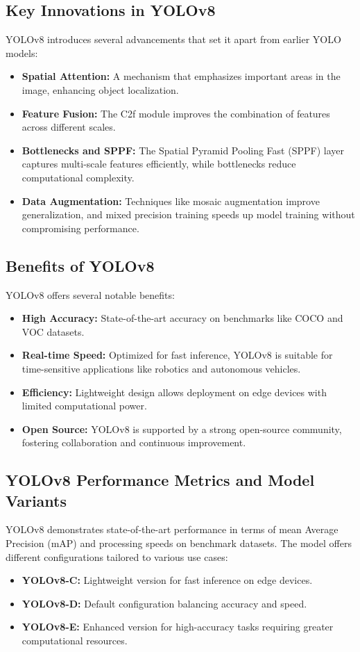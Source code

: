 \documentclass[conference]{IEEEtran}
\begin{document}
\subsection{Key Innovations in YOLOv8}
YOLOv8 introduces several advancements that set it apart from earlier YOLO models:
\begin{itemize}
    \item \textbf{Spatial Attention:} A mechanism that emphasizes important areas in the image, enhancing object localization.
    \item \textbf{Feature Fusion:} The C2f module improves the combination of features across different scales.
    \item \textbf{Bottlenecks and SPPF:} The Spatial Pyramid Pooling Fast (SPPF) layer captures multi-scale features efficiently, while bottlenecks reduce computational complexity.
    \item \textbf{Data Augmentation:} Techniques like mosaic augmentation improve generalization, and mixed precision training speeds up model training without compromising performance.
\end{itemize}

\subsection{Benefits of YOLOv8}
YOLOv8 offers several notable benefits:
\begin{itemize}
    \item \textbf{High Accuracy:} State-of-the-art accuracy on benchmarks like COCO and VOC datasets.
    \item \textbf{Real-time Speed:} Optimized for fast inference, YOLOv8 is suitable for time-sensitive applications like robotics and autonomous vehicles.
    \item \textbf{Efficiency:} Lightweight design allows deployment on edge devices with limited computational power.
    \item \textbf{Open Source:} YOLOv8 is supported by a strong open-source community, fostering collaboration and continuous improvement.
\end{itemize}

\subsection{YOLOv8 Performance Metrics and Model Variants}
YOLOv8 demonstrates state-of-the-art performance in terms of mean Average Precision (mAP) and processing speeds on benchmark datasets. The model offers different configurations tailored to various use cases:
\begin{itemize}
    \item \textbf{YOLOv8-C:} Lightweight version for fast inference on edge devices.
    \item \textbf{YOLOv8-D:} Default configuration balancing accuracy and speed.
    \item \textbf{YOLOv8-E:} Enhanced version for high-accuracy tasks requiring greater computational resources.
\end{itemize}
\end{document}

